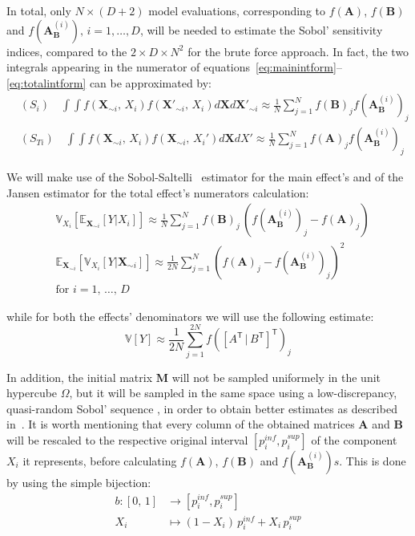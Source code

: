 \noindent
In total, only $N\times (D + 2)$ model evaluations, corresponding to $f(\mathbf{A})$, $f(\mathbf{B})$ and $f(\mathbf{A}_{\mathbf{B}}^{(i)}),\,i=1,\dots,D$, will be needed to estimate the Sobol' sensitivity indices, compared to the $2\times D\times N^2$ for the brute force approach. In fact, the two integrals appearing in the numerator of equations~\eqref{eq:mainintform}--\eqref{eq:totalintform} can be approximated by:
%
\begin{align}
    & (S_{i})\quad \int\int f(\mathbf{X}_{\sim i},\, X_i)f(\mathbf{X'}_{\sim i},\, X_i)d\mathbf{X}d\mathbf{X'}_{\sim i} \approx \frac{1}{N}\sum_{j=1}^{N} f(\mathbf{B})_{j}f(\mathbf{A}_{\mathbf{B}}^{(i)})_{j} \\
    & (S_{Ti})\quad \int\int f(\mathbf{X}_{\sim i},\, X_i)f(\mathbf{X}_{\sim i},\, X_i')d\mathbf{X}dX' \approx \frac{1}{N}\sum_{j=1}^{N} f(\mathbf{A})_{j}f(\mathbf{A}_{\mathbf{B}}^{(i)})_{j}
\end{align}


\vspace{0.2cm}
We will make use of the Sobol-Saltelli~\cite{Saltelli:2010} estimator for the main effect's and of the Jansen  estimator for the total effect's numerators calculation:
%
\begin{align}\label{eq:gsaestimators}
    & \mathbb{V}_{X_i}[\mathbb{E}_{\mathbf{X}_{\sim i}}[Y|X_i]] \approx \frac{1}{N}\sum_{j=1}^{N}f(\mathbf{B})_j\,(f(\mathbf{A}_{\mathbf{B}}^{(i)})_j - f(\mathbf{A})_j) \\
    & \mathbb{E}_{\mathbf{X}_{\sim i}}[\mathbb{V}_{X_i}[Y|\mathbf{X}_{\sim i}]] \approx \frac{1}{2N}\sum_{j=1}^{N}(f(\mathbf{A})_j-f(\mathbf{A}_{\mathbf{B}}^{(i)})_j)^2 \\
    & \text{for}\,\,i=1,\,\dots,\,D
\end{align}

\noindent
while for both the effects' denominators we will use the following estimate:
%
\begin{equation}\label{eq:varianceestimate}
    \mathbb{V}[Y] \approx \frac{1}{2N} \sum_{j=1}^{2N} f([A^\mathsf{T}\,|\,B^\mathsf{T}]^\mathsf{T})_j
\end{equation}

\noindent
In addition, the initial matrix $\mathbf{M}$ will not be sampled uniformely in the unit hypercube $\Omega$, but it will be sampled in the same space using a low-discrepancy, quasi-random Sobol' sequence , in order to obtain better estimates as described in~\cite{Saltelli:2010}. It is worth mentioning that every column of the obtained matrices $\mathbf{A}$ and $\mathbf{B}$ will be rescaled to the respective original interval $[p_i^{inf}, p_i^{sup}]$ of the component $X_i$ it represents, before calculating $f(\mathbf{A})$, $f(\mathbf{B})$ and $f(\mathbf{A}_{\mathbf{B}}^{(i)})s$. This is done by using the simple bijection:
%
\begin{align}
    b \colon [0,\,1] &\to [p_i^{inf}, p_i^{sup}] \\
    X_i &\mapsto (1 - X_i)\,p_i^{inf} + X_i\,p_i^{sup}
\end{align}


